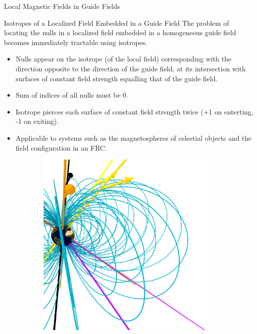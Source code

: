\documentclass[final]{beamer}
\newlength{\onecolwid}
\begin{document}
\begin{frame}[t]
\begin{columns}[t]
\begin{column}{\onecolwid}
\begin{block}{\huge{Local Magnetic Fields in Guide Fields}}
\begin{block}{Isotropes of a Localized Field Embedded in a Guide Field}
  The problem of locating the nulls in a localized field embedded in a homogeneous guide field becomes
  immediately tractable using isotropes.
  \begin{itemize}
    \item Nulls appear on the isotrope (of the local field) corresponding with the direction opposite to the
      direction of the guide field,
      at its intersection with surfaces of constant field strength equalling that of the guide field.
    \item Sum of indices of all nulls must be 0.
    \item Isotrope pierces each surface of constant field strength twice (+1 on enterting, -1 on exiting).
    \item Applicable to systems such as the magnetospheres of celestial objects and
      the field configuration in an FRC.
   \end{itemize}
  \begin{figure}
    \centering
    \begin{subfigure}[b]{.42\textwidth}
      \includegraphics[width=\textwidth]{fig/mainfig.png}
      \caption{}
    \end{subfigure}
    \begin{subfigure}[b]{.42\textwidth}

\end{subfigure}
\end{figure}
\end{block}
\end{block}
\end{column}
\end{columns}
\end{frame}
\end{document}
